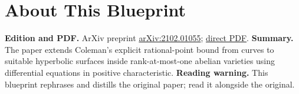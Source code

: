 

\chapter*{About This Blueprint}
\label{chabauty-coleman-bound-surfaces-about}

\textbf{Edition and PDF.} ArXiv preprint \href{https://arxiv.org/abs/2102.01055}{arXiv:2102.01055};
\href{https://arxiv.org/pdf/2102.01055}{direct PDF}.
\textbf{Summary.} The paper extends Coleman's explicit rational-point bound from curves to suitable hyperbolic surfaces
inside rank-at-most-one abelian varieties using differential equations in positive characteristic.
\textbf{Reading warning.} This blueprint rephrases and distills the original paper; read it alongside the original.
















